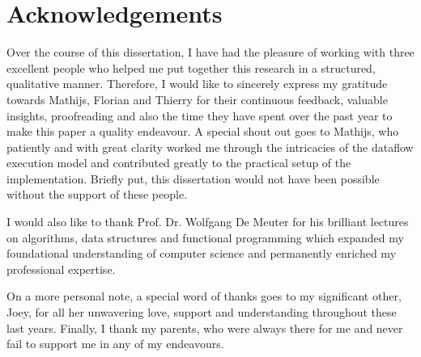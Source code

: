 \section*{Acknowledgements}

Over the course of this dissertation, I have had the pleasure of working with three excellent people who helped me put together this research in a structured, qualitative manner. Therefore, I would like to sincerely express my gratitude towards Mathijs, Florian and Thierry for their continuous feedback, valuable insights, proofreading and also the time they have spent over the past year to make this paper a quality endeavour. A special shout out goes to Mathijs, who patiently and with great clarity worked me through the intricacies of the dataflow execution model and contributed greatly to the practical setup of the implementation. Briefly put, this dissertation would not have been possible without the support of these people. 

\smallskip

I would also like to thank Prof. Dr. Wolfgang De Meuter for his brilliant lectures on algorithms, data structures and functional programming which expanded my foundational understanding of computer science and permanently enriched my professional expertise.

\smallskip

On a more personal note, a special word of thanks goes to my significant other, Joey, for all her unwavering love, support and understanding throughout these last years. Finally, I thank my parents, who were always there for me and never fail to support me in any of my endeavours. 